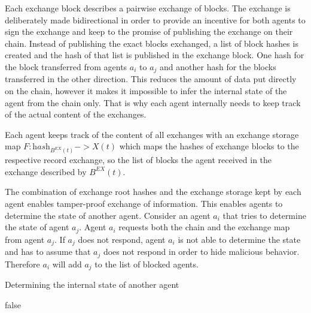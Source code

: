 Each exchange block describes a pairwise exchange of blocks. The exchange is deliberately made 
bidirectional in order to provide an incentive for both agents to sign the exchange and keep to the 
promise of publishing the exchange on their chain. Instead of publishing the exact blocks exchanged,
a list of block hashes is created and the hash of that list is published in the exchange block. One 
hash for the block transferred from agents $a_i$ to $a_j$ and another hash for the blocks transferred in the 
other direction. This reduces the amount of data put directly on the chain, however it makes it 
impossible to infer the internal state of the agent from the chain only. That is why each agent 
internally needs to keep track of the actual content of the exchanges. 

\begin{defn}
    Each agent keeps track of the content of all exchanges with an exchange storage map 
    $F: \textit{hash}_{B^{EX}(t)} -> X(t)$ which maps the hashes of exchange blocks to the respective record
    exchange, so the list of blocks the agent received in the exchange described by $B^{EX}(t)$.
\end{defn}

The combination of exchange root hashes and the exchange storage kept by each agent enables tamper-proof
exchange of information. This enables agents to determine the state of another agent. Consider an 
agent $a_i$ that tries to determine the state of agent $a_j$. Agent $a_i$ requests both the chain 
and the exchange map from agent $a_j$. If $a_j$ does not respond, agent $a_i$ is not able to determine 
the state and has to assume that $a_j$ does not respond in order to hide malicious behavior. Therefore
$a_i$ will add $a_j$ to the list of blocked agents.

\begin{algorithm}
\caption{Determining the internal state of another agent}\label{euclid}
\begin{algorithmic}[1]
 \Return false
\EndIf
{}
\EndFor
\EndProcedure
\end{algorithmic}
\end{algorithm}